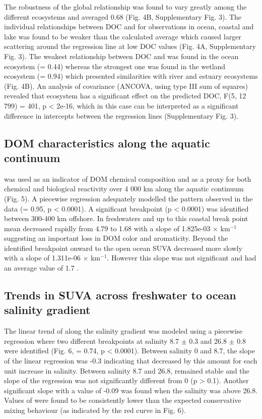 The robustness of the global relationship was found to vary greatly among the different ecosystems and \rr averaged 0.68 (Fig. 4B, Supplementary Fig. 3). The individual relationships between DOC and  for observations in ocean, coastal and lake was found to be weaker than the calculated average which caused larger scattering around the regression line at low DOC values (Fig. 4A, Supplementary Fig. 3). The weakest relationship between DOC and  was found in the ocean ecosystem (\rr = 0.44) whereas the strongest one was found in the wetland ecosystem (\rr = 0.94) which presented similarities with river and estuary ecosystems (Fig. 4B). An analysis of covariance (ANCOVA, using type III sum of squares) revealed that ecosystem has a significant effect on the predicted DOC, F(5, 12 799) = 401, p < 2e-16, which in this case can be interpreted as a significant difference in intercepts between the regression lines (Supplementary Fig. 3).

\subsection*{DOM characteristics along the aquatic continuum}

 was used as an indicator of DOM chemical composition and as a proxy for both chemical and biological reactivity over 4 000 km along the aquatic continuum (Fig. 5). A piecewise regression adequately modelled the pattern observed in the data (\rr = 0.95, p < 0.0001). A significant breakpoint (p < 0.0001) was identified between 300-400 km offshore. In freshwaters and up to this coastal break point mean  decreased rapidly from 4.79 to 1.68 \suvagram with a slope of 1.825e-03 \suvagram $\times$ km$^{-1}$ suggesting an important loss in DOM color and aromaticity. Beyond the identified breakpoint onward to the open ocean SUVA decreased more slowly with a slope of 1.311e-06 \suvagram $\times$ km$^{-1}$. However this slope was not significant and  had an average value of 1.7 \suvagram. 

\subsection*{Trends in SUVA across freshwater to ocean salinity gradient}

The linear trend of  along the salinity gradient was modeled using a piecewise regression where two different breakpoints at salinity 8.7 $\pm$ 0.3 and 26.8 $\pm$ 0.8 were identified (Fig. 6, \rr = 0.74, p < 0.0001). Between salinity 0 and 8.7, the slope of the linear regression was -0.3 indicating that  decreased by this amount for each unit increase in salinity. Between salinity 8.7 and 26.8,  remained stable and the slope of the regression was not significantly different from 0 (p > 0.1). Another significant slope with a value of -0.09 was found when the salinity was above 26.8. Values of  were found to be consistently lower than the expected conservative mixing behaviour (as indicated by the red curve in Fig. 6).    

